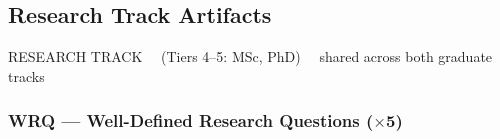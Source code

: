 \documentclass[11pt,a4paper]{article}
\begin{document}
\newpage
\subsection{Research Track Artifacts}
\label{sec:research-artifacts}

\begin{tcolorbox}[trackheaderRES]
RESEARCH TRACK \ \ (Tiers 4--5: MSc, PhD) \ \ shared across both graduate tracks
\end{tcolorbox}

\bigskip

\subsubsection{WRQ --- Well-Defined Research Questions ($\times$5)}
\end{document}
